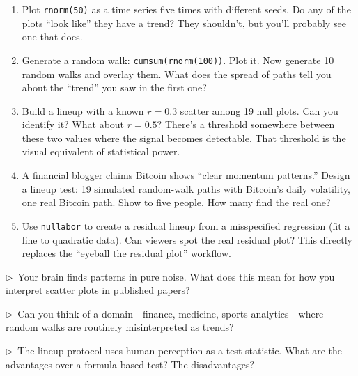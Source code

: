 \begin{enumerate}
  \item Plot \texttt{rnorm(50)} as a time series five times with different seeds. Do any of the plots ``look like'' they have a trend? They shouldn't, but you'll probably see one that does.

  \item Generate a random walk: \texttt{cumsum(rnorm(100))}. Plot it. Now generate 10 random walks and overlay them. What does the spread of paths tell you about the ``trend'' you saw in the first one?

  \item Build a lineup with a known $r = 0.3$ scatter among 19 null plots. Can you identify it? What about $r = 0.5$? There's a threshold somewhere between these two values where the signal becomes detectable. That threshold is the visual equivalent of statistical power.

  \item A financial blogger claims Bitcoin shows ``clear momentum patterns.'' Design a lineup test: 19 simulated random-walk paths with Bitcoin's daily volatility, one real Bitcoin path. Show to five people. How many find the real one?

  \item Use \texttt{nullabor} to create a residual lineup from a misspecified regression (fit a line to quadratic data). Can viewers spot the real residual plot? This directly replaces the ``eyeball the residual plot'' workflow.
\end{enumerate}

\begin{reflect}
$\triangleright$~Your brain finds patterns in pure noise. What does this mean for how you interpret scatter plots in published papers?

\smallskip
$\triangleright$~Can you think of a domain---finance, medicine, sports analytics---where random walks are routinely misinterpreted as trends?

\smallskip
$\triangleright$~The lineup protocol uses human perception as a test statistic. What are the advantages over a formula-based test? The disadvantages?
\end{reflect}

